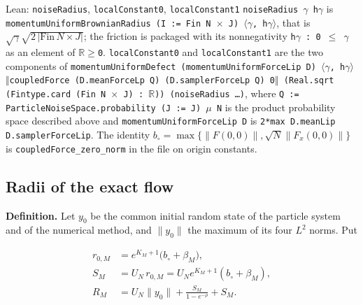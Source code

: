 \documentclass[11pt,a4paper]{report}
\begin{document}
\begin{leanbox}{Lean: \texttt{noiseRadius}, \texttt{localConstant0}, \texttt{localConstant1}}
\texttt{noise\allowbreak{}Radius \ensuremath{\gamma} h\ensuremath{\gamma}} is \texttt{momentum\allowbreak{}Uniform\allowbreak{}Brownian\allowbreak{}Radius (I := Fin N \ensuremath{\times} J) \ensuremath{\langle}\ensuremath{\gamma}, h\ensuremath{\gamma}\ensuremath{\rangle}}, that is \(\sqrt\gamma\sqrt{2\,|\mathrm{Fin}\,N\times J|}\); the friction is packaged with its nonnegativity \texttt{h\ensuremath{\gamma} : 0 \ensuremath{\le} \ensuremath{\gamma}} as an element of \texttt{\ensuremath{\mathbb R}\ensuremath{\ge}0}. \texttt{local\allowbreak{}Constant0} and \texttt{local\allowbreak{}Constant1} are the two components of \texttt{momentum\allowbreak{}Uniform\allowbreak{}Defect (momentum\allowbreak{}Uniform\allowbreak{}Force\allowbreak{}Lip D) \ensuremath{\langle}\ensuremath{\gamma}, h\ensuremath{\gamma}\ensuremath{\rangle} \ensuremath{\Vert}coupled\allowbreak{}Force (D.\allowbreak{}mean\allowbreak{}Force\allowbreak{}Lp Q) (D.\allowbreak{}sampler\allowbreak{}Force\allowbreak{}Lp Q) 0\ensuremath{\Vert} (Real.\allowbreak{}sqrt (Fintype.\allowbreak{}card (Fin N \ensuremath{\times} J) : \ensuremath{\mathbb R})) (noise\allowbreak{}Radius …)}, where \texttt{Q := Particle\allowbreak{}Noise\allowbreak{}Space.\allowbreak{}probability (J := J) \ensuremath{\mu} N} is the product probability space described above and \texttt{momentum\allowbreak{}Uniform\allowbreak{}Force\allowbreak{}Lip D} is \texttt{2*max D.\allowbreak{}mean\allowbreak{}Lip D.\allowbreak{}sampler\allowbreak{}Force\allowbreak{}Lip}. The identity \(b_\circ=\max\{\|F(0,0)\|,\sqrt N\|F_x(0,0)\|\}\) is \texttt{coupled\allowbreak{}Force\_\allowbreak{}zero\_\allowbreak{}norm} in the file on origin constants.
\end{leanbox}
\subsection{\texorpdfstring{Radii of the exact flow}{Radii of the exact flow}}


\textbf{Definition.} Let \(y_0\) be the common initial random state of the particle system and of the numerical method, and \(\|y_0\|\) the maximum of its four \(L^2\) norms. Put


\[\begin{aligned}r_{0,M}&=e^{K_M+1}\bigl(b_\circ+\beta_M\bigr),\\ S_M&=U_N\,r_{0,M}=U_Ne^{K_M+1}(b_\circ+\beta_M),\\ R_M&=U_N\|y_0\|+\frac{S_M}{1-e^{-\rho}}+S_M.\end{aligned}\]
\end{document}

